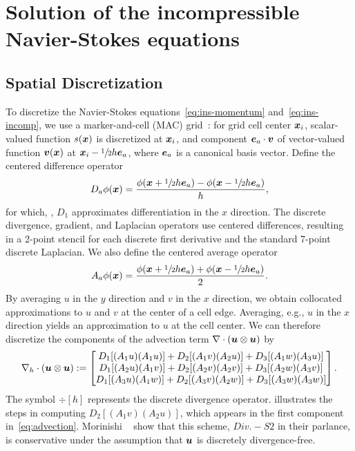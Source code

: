 \section{Solution of the incompressible Navier-Stokes equations}\label{sec:ins}

\subsection{Spatial Discretization}\label{sec:ns_space}

To discretize the Navier-Stokes equations~\eqref{eq:ins-momentum} and~\eqref{eq:ins-incomp}, we use a
marker-and-cell (MAC) grid~\cite{Welch:1965jv}: for grid cell center $\boldsymbol{x}_i$, scalar-valued function $s(\boldsymbol{x})$ is
discretized at $\boldsymbol{x}_i$, and component $\boldsymbol{e}_a\cdot\boldsymbol{v}$ of vector-valued function $\boldsymbol{v}(\boldsymbol{x})$ at
$\boldsymbol{x}_i-\sfrac12h\boldsymbol{e}_a$, where $\boldsymbol{e}_a$ is a canonical basis vector. Define the centered difference operator
\begin{equation*}
    D_a\phi(\boldsymbol{x}) = \frac{\phi(\boldsymbol{x}+\sfrac12 h\boldsymbol{e}_a) - \phi(\boldsymbol{x}-\sfrac12 h\boldsymbol{e}_a)}{h},
\end{equation*}
for which, , $D_1$ approximates differentiation in the $x$ direction. The discrete divergence,
gradient, and Laplacian operators use centered differences, resulting in a 2-point stencil for each discrete first
derivative and the standard 7-point discrete Laplacian. We also define the centered average operator
\begin{equation*}
    A_a\phi(\boldsymbol{x}) = \frac{\phi(\boldsymbol{x}+\sfrac12 h\boldsymbol{e}_a) + \phi(\boldsymbol{x}-\sfrac12 h\boldsymbol{e}_a)}2.
\end{equation*}
By averaging $u$ in the $y$ direction and $v$ in the $x$ direction, we obtain collocated approximations to $u$ and
$v$ at the center of a cell edge. Averaging, e.g., $u$ in the $x$ direction yields an approximation to $u$ at the
cell center. We can therefore discretize the components of the advection term $\div(\u\otimes\u)$ by
\begin{equation}\label{eq:advection}
    \div[h](\u\otimes\u) :=
    \begin{bmatrix}
        D_1[(A_1 u) (A_1 u)] + D_2[(A_1 v) (A_2 u)] + D_3[(A_1 w) (A_3 u)] \\
        D_1[(A_2 u) (A_1 v)] + D_2[(A_2 v) (A_2 v)] + D_3[(A_2 w) (A_3 v)] \\
        D_1[(A_3 u) (A_1 w)] + D_2[(A_3 v) (A_2 w)] + D_3[(A_3 w) (A_3 w)]
    \end{bmatrix}.
\end{equation}
The symbol $\div[h]$ represents the discrete divergence operator.   illustrates the steps
in computing $D_2[(A_1 v)(A_2 u)]$, which appears in the first component in~\eqref{eq:advection}. Morinishi
~\cite{Morinishi:1998us} show that this scheme, $Div. - S2$ in their parlance, is conservative under
the assumption that $\boldsymbol{u}$ is discretely divergence-free.

